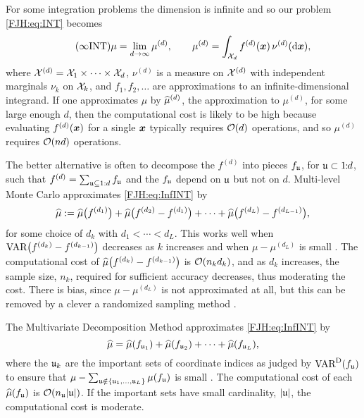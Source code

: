 \documentclass[graybox,footinfo]{svmult}
\begin{document}
\begin{FJHLesson}
	\FJHLessonTwelve
\end{FJHLesson}

For some integration problems the dimension is infinite and so our problem \eqref{FJH:eq:INT} 
becomes
\begin{equation} \label{FJH:eq:InfINT} \tag{$\infty$INT}
\mu = \lim_{d \to \infty} \mu^{(d)}, \qquad \mu^{(d)} = \int_{\calX_d} f^{(d)}(\bsx) \, 
\nu^{(d)}(\D 
\bsx),
\end{equation} 
where ${\mathcal{X}}^{(d)} = {\mathcal{X}}_1 \times \cdots \times {\mathcal{X}}_d$, $\nu^{(d)}$ is a measure on 
${\mathcal{X}}^{(d)} $ 
with 
independent marginals $\nu_k$ on ${\mathcal{X}}_k$, and $f_1, f_2, \ldots$ are approximations to 
an 
infinite-dimensional integrand.  If one approximates $\mu$ by $\widehat{\mu}^{(d)}$, the 
approximation 
to 
$\mu^{(d)}$, for some large enough $d$, then the computational cost is likely to be high 
because evaluating $f^{(d)}({\boldsymbol{x}})$ for a single ${\boldsymbol{x}}$ typically requires ${\mathcal{O}}(d)$ 
operations, 
and so $\mu^{(d)}$ requires ${\mathcal{O}}(nd)$ operations.

The better alternative is often to decompose the $f^{(d)}$ into pieces $f_{\mathfrak{u}}$, for ${\mathfrak{u}} 
\subset 
1 \!\!:\!\! d$, such that $f^{(d)} = \sum_{{\mathfrak{u}} \subseteq 1:d} f_{{\mathfrak{u}}}$ and the 
$f_{\mathfrak{u}}$ depend on ${\mathfrak{u}}$ but not on $d$.  Multi-level Monte Carlo 
approximates \eqref{FJH:eq:InfINT} by
\begin{equation*}
\widehat{\mu} := \widehat{\mu}\bigl(f^{(d_1)}\bigr) + \widehat{\mu}\bigl(f^{(d_2)} - f^{(d_1)}\bigr) + 
\cdots + \widehat{\mu}\bigl(f^{(d_L)} - f^{(d_{L-1})}\bigr), 
\end{equation*}
for some choice of $d_k$ with $d_1 < \cdots < d_L$.  This works well when $\textup{VAR}\bigl(f^{(d_k)} 
- f^{(d_{k-1} )} \bigr)$ decreases as $k$ increases and when $\mu - \mu^{(d_L)}$ is small \cite{
	Gil14a, Gil15a, Gil08b, Hei01a,  HicMGRitNiu09a, NiuHic09b}.  The computational cost of 
	$\widehat{\mu}\bigl(f^{(d_k)} - 
f^{(d_{k-1})} \bigr)$ is ${\mathcal{O}}(n_k d_k)$, and as $d_k$ increases, the sample size, $n_k$, 
required for sufficient accuracy decreases, thus moderating the cost.   There is bias, since 
$\mu - 
	\mu^{(d_L)}$ is not approximated at all, but this can be removed by a clever a randomized 
	sampling method \cite{RheGly12a}.
	
The Multivariate Decomposition Method approximates \eqref{FJH:eq:InfINT} by
\begin{equation*}
\widehat{\mu} = \widehat{\mu}(f_{{\mathfrak{u}}_1}) + \widehat{\mu}(f_{{\mathfrak{u}}_2}) + 
		\cdots +\widehat{\mu}(f_{{\mathfrak{u}}_L}),
\end{equation*} 
where the ${\mathfrak{u}}_k$ are the important sets of coordinate indices as judged by 
$\textup{VAR}^{\textup{D}}(f_{\mathfrak{u}})$ to ensure that $\mu - \sum_{{\mathfrak{u}} \notin \{{\mathfrak{u}}_1,   \ldots, 
	{\mathfrak{u}}_L\}} \mu(f_{\mathfrak{u}})$ is small \cite{Was13b}.  The computational cost of each 
	$\widehat{\mu}(f_{{\mathfrak{u}}})$ 
is ${\mathcal{O}}(n_{\mathfrak{u}} \lvert {\mathfrak{u}} \rvert)$.  If the important sets have small cardinality, 
$\lvert {\mathfrak{u}} \rvert$, the computational cost is moderate.  
\end{document}
